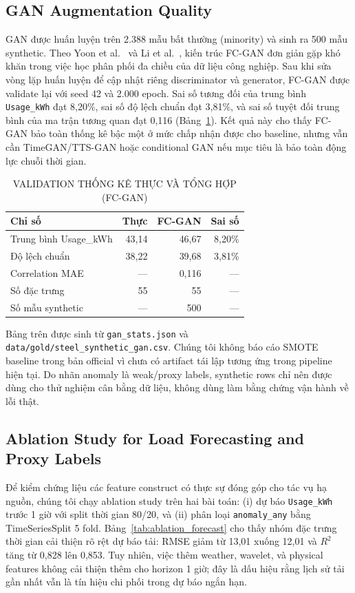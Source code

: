 \documentclass[conference]{IEEEtran}
\begin{document}
\subsection{GAN Augmentation Quality}

GAN được huấn luyện trên 2.388 mẫu bất thường (minority) và sinh ra 500 mẫu synthetic.
Theo Yoon et al.~\cite{yoon2019} và Li et al.~\cite{li2022ttsgan},
kiến trúc FC-GAN đơn giản gặp khó khăn trong việc học phân phối đa chiều của dữ liệu công nghiệp.
Sau khi sửa vòng lặp huấn luyện để cập nhật riêng discriminator và generator, FC-GAN được validate lại với seed 42 và 2.000 epoch.
Sai số tương đối của trung bình \texttt{Usage\_kWh} đạt 8,20\%,
sai số độ lệch chuẩn đạt 3,81\%, và sai số tuyệt đối trung bình của ma trận tương quan đạt 0,116 (Bảng~\ref{tab:gan}).
Kết quả này cho thấy FC-GAN bảo toàn thống kê bậc một ở mức chấp nhận được cho baseline,
nhưng vẫn cần TimeGAN/TTS-GAN hoặc conditional GAN nếu mục tiêu là bảo toàn động lực chuỗi thời gian.

\begin{table}[htbp]
\caption{VALIDATION THỐNG KÊ THỰC VÀ TỔNG HỢP (FC-GAN)}
\label{tab:gan}
\centering
\small
\begin{tabular}{@{}lrrr@{}}
\toprule
Chỉ số & Thực & FC-GAN & Sai số \\
\midrule
Trung bình Usage\_kWh & 43,14 & 46,67 & 8,20\% \\
Độ lệch chuẩn & 38,22 & 39,68 & 3,81\% \\
Correlation MAE & --- & 0,116 & --- \\
Số đặc trưng & 55 & 55 & --- \\
Số mẫu synthetic & --- & 500 & --- \\
\bottomrule
\end{tabular}
\end{table}

Bảng trên được sinh từ \texttt{gan\_stats.json} và \texttt{data/gold/steel\_synthetic\_gan.csv}.
Chúng tôi không báo cáo SMOTE baseline trong bản official vì chưa có artifact tái lập tương ứng trong pipeline hiện tại.
Do nhãn anomaly là weak/proxy labels, synthetic rows chỉ nên được dùng cho thử nghiệm cân bằng dữ liệu, không dùng làm bằng chứng vận hành về lỗi thật.

\subsection{Ablation Study for Load Forecasting and Proxy Labels}

Để kiểm chứng liệu các feature construct có thực sự đóng góp cho tác vụ hạ nguồn,
chúng tôi chạy ablation study trên hai bài toán: (i) dự báo \texttt{Usage\_kWh} trước 1 giờ
với split thời gian 80/20, và (ii) phân loại \texttt{anomaly\_any} bằng TimeSeriesSplit 5 fold.
Bảng~\ref{tab:ablation_forecast} cho thấy nhóm đặc trưng thời gian cải thiện rõ rệt dự báo tải:
RMSE giảm từ 13,01 xuống 12,01 và $R^2$ tăng từ 0,828 lên 0,853.
Tuy nhiên, việc thêm weather, wavelet, và physical features không cải thiện thêm cho horizon 1 giờ;
đây là dấu hiệu rằng lịch sử tải gần nhất vẫn là tín hiệu chi phối trong dự báo ngắn hạn.
\end{document}
